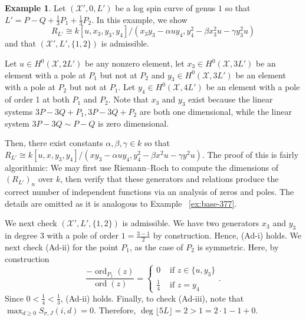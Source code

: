 \documentclass{amsart}
\theoremstyle{plain}
\theoremstyle{definition}
\newtheorem{example}[thm]{Example}
\theoremstyle{remark}
\numberwithin{equation}{section}
\newcommand \sx{\mathscr X}
\DeclareMathOperator{\ord}{ord}
\newcommand{\halfcan}{L}
\begin{document}
\begin{example}
\label{eg:base-1-33}
Let $(\sx',0 ,\halfcan')$ be a log spin curve of genus $1$ so that $\halfcan' = P - Q + \frac{1}{3}P_1 + \frac{1}{3}P_2$. In this example, we show
$$R_{\halfcan'} \cong k[u, x_3, y_3, y_4]/(x_3 y_3- \alpha uy_4, y_4^2 - \beta x_3^2 u - \gamma y_3^2u)$$
and that $(\sx', \halfcan',\{1,2\})$ is admissible.

Let $u \in H^0(\sx,2\halfcan')$ be any nonzero element, let $x_3 \in H^0(\sx,3\halfcan')$ be an element with a pole at $P_1$ but not at $P_2$ and $y_3 \in H^0(\sx,3\halfcan')$ be an element with a pole at $P_2$ but not at $P_1$. Let $y_4 \in H^0(\sx,4\halfcan')$ be an element with a pole of order 1 at both $P_1$ and $P_2$. Note that $x_3$ and $y_3$ exist because the linear systems $3P - 3Q + P_1, 3P - 3Q + P_2$ are both one dimensional, while the linear system $3P - 3Q \sim P - Q$ is zero dimensional.

Then, there exist constants $\alpha,\beta,\gamma \in k$ so that 
$R_{\halfcan'} \cong k[u, x, y_3, y_4]/(xy_3- \alpha uy_4, y_4^2 - \beta x^2 u - \gamma y^2u).$ The proof of this is fairly algorithmic: We may first use Riemann--Roch to compute the dimensions of $(R_{\halfcan'})_n$ over $k$, then verify that these generators and relations produce the correct number of independent functions via an analysis of zeros and poles. The details are omitted as it is analogous to Example ~\ref{ex:base-377}.

We next check $(\sx', \halfcan',\{1,2\})$ is admissible. We have two generators $x_3$ and $y_3$ in degree 3 with a pole of order $1=\frac{3- 1}{2}$ by construction. Hence, (Ad-i) holds. We next check (Ad-ii) for the point $P_1$, as the case of $P_2$ is symmetric. Here, by construction
$$
\frac{-\ord_{P_1}(z)}{\ord(z)} = \begin{cases}
	0 &\text{ if }z \in \{u, y_3\}\\
	\frac{1}{4} &\text{ if }z = y_4
\end{cases}.$$
Since $0 < \frac{1}{4} < \frac{1}{3}$, (Ad-ii) holds.
Finally, to check (Ad-iii), note that $\max_{d \geq 0}S_{\sigma,J}(i,d) = 0.$ Therefore, $\deg \lfloor 5L \rfloor  = 2 > 1 = 2 \cdot 1 - 1 + 0$.
\end{example}
\end{document}
